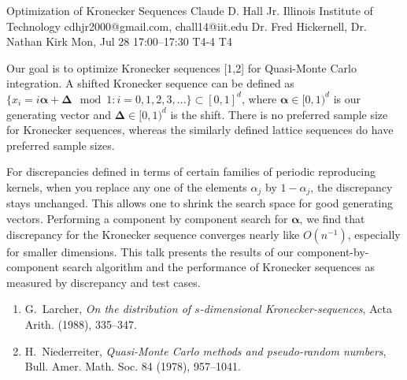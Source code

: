 \documentclass[12pt,lettersize,oneside]{book} %
\begin{document}
\begin{talk}
  {Optimization of Kronecker Sequences}%
  {Claude D. Hall Jr.}%
  {Illinois Institute of Technology}%
  {cdhjr2000@gmail.com, chall14@iit.edu}%
  {Dr. Fred Hickernell, Dr. Nathan Kirk}%
  {}%
  {Mon, Jul 28 17:00--17:30}%
  {T4-4}%
  {T4}%
  
    

Our goal is to optimize Kronecker sequences [1,2] for Quasi-Monte Carlo integration. A shifted Kronecker sequence can be defined as $\{ x_i = i \boldsymbol{\alpha} + \boldsymbol{\Delta} \mod 1: i = 0, 1, 2, 3, ... \} \subset [0,1]^d $, where  $\boldsymbol{\alpha} \in [0,1)^d$ is our generating vector and $\boldsymbol{\Delta} \in [0,1)^d$ is the shift. There is no preferred sample size for Kronecker sequences, whereas the similarly defined lattice sequences do have preferred sample sizes. 

For discrepancies defined in terms of certain families of periodic reproducing kernels, when you replace any one of the elements $\alpha_j$ by $1 - \alpha_j$, the discrepancy stays unchanged. This allows one to shrink the search space for good generating vectors.  Performing a component by component search for $\boldsymbol{\alpha}$, we find that discrepancy for the Kronecker sequence converges nearly like $O(n^{-1})$, especially for smaller dimensions.  This talk presents the results of our component-by-component search algorithm and the performance of Kronecker sequences as measured by discrepancy and test cases.

\medskip

\begin{enumerate}
 \item[{[1]}] G.~Larcher, \emph{On the distribution of $s$-dimensional {K}ronecker-sequences}, Acta Arith. (1988), 335--347.
 \item[{[2]}] H.~Niederreiter, \emph{Quasi-Monte Carlo methods and pseudo-random numbers}, Bull. Amer. Math. Soc. 84 (1978), 957--1041.
\end{enumerate}
\end{talk}
\end{document}
